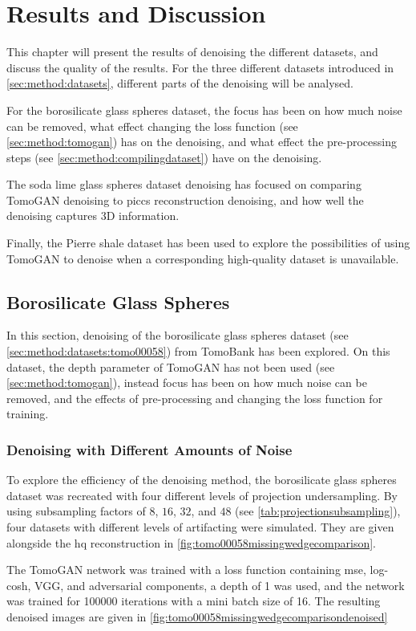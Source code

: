 \chapter{Results and Discussion}
\label{sec:results}
This chapter will present the results of denoising the different datasets, and discuss the quality of the results. For the three different datasets introduced in \cref{sec:method:datasets}, different parts of the denoising will be analysed. 

For the borosilicate glass spheres dataset, the focus has been on how much noise can be removed, what effect changing the loss function (see \cref{sec:method:tomogan}) has on the denoising, and what effect the pre-processing steps (see \cref{sec:method:compilingdataset}) have on the denoising. 

The soda lime glass spheres dataset denoising has focused on comparing TomoGAN denoising to \gls{piccs} reconstruction denoising, and how well the denoising captures 3D information. 

Finally, the Pierre shale dataset has been used to explore the possibilities of using TomoGAN to denoise when a corresponding high-quality dataset is unavailable. 

\section{Borosilicate Glass Spheres}
In this section, denoising of the borosilicate glass spheres dataset (see \cref{sec:method:datasets:tomo00058}) from TomoBank has been explored. On this dataset, the depth parameter of TomoGAN has not been used (see \cref{sec:method:tomogan}), instead focus has been on how much noise can be removed, and the effects of pre-processing and changing the loss function for training.

\subsection{Denoising with Different Amounts of Noise}
To explore the efficiency of the denoising method, the borosilicate glass spheres dataset was recreated with four different levels of projection undersampling. By using subsampling factors of $8$, $16$, $32$, and $48$ (see \cref{tab:projectionsubsampling}), four datasets with different levels of artifacting were simulated. They are given alongside the \gls{hq} reconstruction in \cref{fig:tomo00058missingwedgecomparison}. 

The TomoGAN network was trained with a loss function containing \gls{mse}, log-cosh, VGG, and adversarial components, a depth of 1 was used, and the network was trained for 100000 iterations with a mini batch size of 16. The resulting denoised images are given in \cref{fig:tomo00058missingwedgecomparisondenoised}

